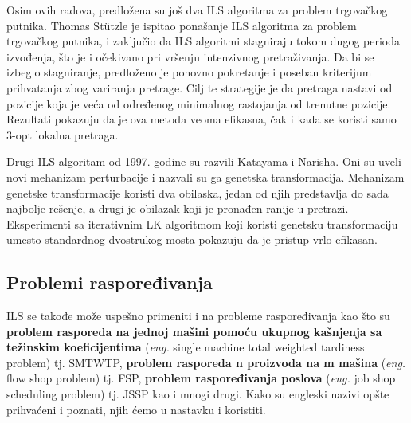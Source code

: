 \documentclass[a4paper]{article}
\newcommand{\eng}[1]{(\textit{eng.} #1)}
\begin{document}
Osim ovih radova, predložena su još dva ILS algoritma za problem trgovačkog putnika. Thomas Stützle je ispitao ponašanje ILS algoritma za problem trgovačkog putnika, i zaključio da ILS algoritmi stagniraju tokom dugog perioda izvođenja, što je i očekivano pri vršenju intenzivnog pretraživanja. Da bi se izbeglo stagniranje, predloženo je ponovno pokretanje i poseban kriterijum prihvatanja zbog variranja pretrage. Cilj te strategije je da pretraga nastavi od pozicije koja je veća od određenog minimalnog rastojanja od trenutne pozicije. Rezultati pokazuju da je ova metoda veoma efikasna, čak i kada se koristi samo 3-opt lokalna pretraga. 


Drugi ILS algoritam od 1997. godine su razvili Katayama i Narisha. Oni su uveli novi mehanizam perturbacije i nazvali su ga genetska transformacija. Mehanizam genetske transformacije koristi dva obilaska, jedan od njih predstavlja do sada najbolje rešenje, a drugi je obilazak koji je pronađen ranije u pretrazi. Eksperimenti sa iterativnim LK algoritmom koji koristi genetsku transformaciju umesto standardnog dvostrukog mosta pokazuju da je pristup vrlo efikasan. \cite{handbookOfMetaheuristics}





\subsection{Problemi raspoređivanja}
ILS se takođe može uspešno primeniti i na probleme raspoređivanja kao što su \textbf{problem rasporeda na jednoj mašini pomoću ukupnog kašnjenja sa težinskim koeficijentima} \eng{single machine total weighted tardiness problem} tj. SMTWTP,  \textbf{problem rasporeda n proizvoda na m mašina} \eng{flow shop problem} tj. FSP, \textbf{problem raspoređivanja poslova} \eng{job shop scheduling problem} tj. JSSP
kao i mnogi drugi. Kako su engleski nazivi opšte prihvaćeni i poznati, njih ćemo u nastavku i koristiti.
\end{document}
